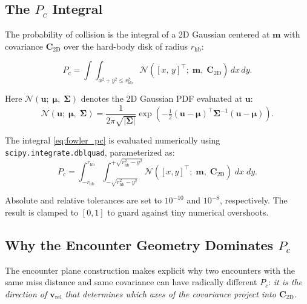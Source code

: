 \documentclass[11pt]{article}
\begin{document}
\subsection{The $P_c$ Integral}

The probability of collision is the integral of a 2D Gaussian centered at
$\mathbf{m}$ with covariance $\mathbf{C}_\text{2D}$ over the hard-body disk
of radius $r_\text{hb}$:

\begin{equation}
  \boxed{
  P_c = \int\!\!\int_{x^2 + y^2 \le r_\text{hb}^2}
    \mathcal{N}\!\left([x,\,y]^\top;\;\mathbf{m},\;\mathbf{C}_\text{2D}\right)
    \, dx\, dy.}
  \label{eq:fowler_pc}
\end{equation}

Here $\mathcal{N}(\mathbf{u};\;\boldsymbol{\mu},\;\boldsymbol{\Sigma})$ denotes
the 2D Gaussian PDF evaluated at $\mathbf{u}$:
\begin{equation}
  \mathcal{N}(\mathbf{u};\;\boldsymbol{\mu},\;\boldsymbol{\Sigma})
  = \frac{1}{2\pi\sqrt{|\boldsymbol{\Sigma}|}}
    \exp\!\left(-\tfrac{1}{2}
    (\mathbf{u}-\boldsymbol{\mu})^\top\boldsymbol{\Sigma}^{-1}
    (\mathbf{u}-\boldsymbol{\mu})\right).
\end{equation}

The integral \eqref{eq:fowler_pc} is evaluated numerically using
\texttt{scipy.integrate.dblquad}, parameterized as:
\begin{equation}
  P_c = \int_{-r_\text{hb}}^{r_\text{hb}}
    \int_{-\sqrt{r_\text{hb}^2 - y^2}}^{+\sqrt{r_\text{hb}^2 - y^2}}
    \mathcal{N}([x,y]^\top;\;\mathbf{m},\;\mathbf{C}_\text{2D})\;dx\;dy.
  \label{eq:dblquad}
\end{equation}

Absolute and relative tolerances are set to $10^{-10}$ and $10^{-8}$,
respectively.  The result is clamped to $[0, 1]$ to guard against tiny
numerical overshoots.

\subsection{Why the Encounter Geometry Dominates $P_c$}

The encounter plane construction makes explicit why two encounters with the
same miss distance and same covariance can have radically different $P_c$:
\emph{it is the direction of $\mathbf{v}_\text{rel}$ that determines which
axes of the covariance project into $\mathbf{C}_\text{2D}$.}
\end{document}
